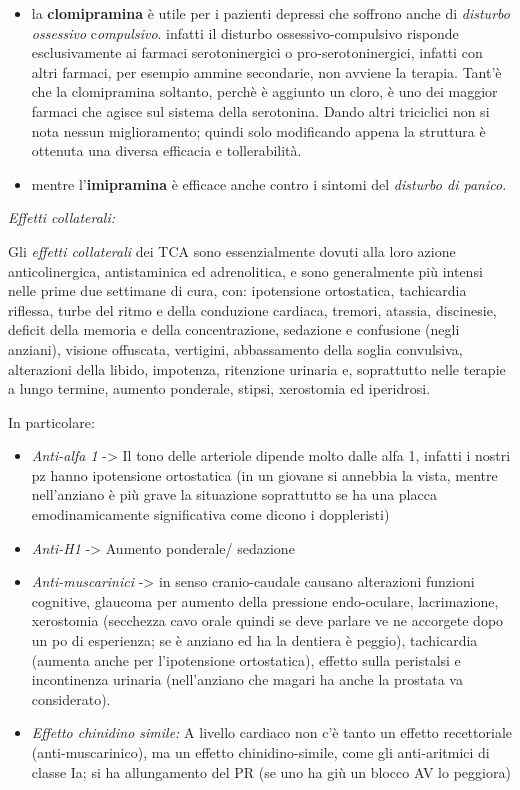 \begin{itemize}
\begin{itemize}
\begin{itemize}
\item
  la \textbf{clomipramina} è utile per i pazienti depressi che soffrono
  anche di \emph{disturbo ossessivo} c\emph{ompulsivo}. infatti il
  disturbo ossessivo-compulsivo risponde esclusivamente ai farmaci
  serotoninergici o pro-serotoninergici, infatti con altri farmaci, per
  esempio ammine secondarie, non avviene la terapia. Tant'è che la
  clomipramina soltanto, perchè è aggiunto un cloro, è uno dei maggior
  farmaci che agisce sul sistema della serotonina. Dando altri
  triciclici non si nota nessun miglioramento; quindi solo modificando
  appena la struttura è ottenuta una diversa efficacia e tollerabilità.
\item
  mentre l'\textbf{imipramina} è efficace anche contro i sintomi del
  \emph{disturbo di panico.}
\end{itemize}

\emph{\emph{Effetti collaterali:}}

Gli \emph{effetti collaterali} dei TCA sono essenzialmente dovuti alla
loro azione anticolinergica, antistaminica ed adrenolitica, e sono
generalmente più intensi nelle prime due settimane di cura, con:
ipotensione ortostatica, tachicardia riflessa, turbe del ritmo e della
conduzione cardiaca, tremori, atassia, discinesie, deficit della memoria
e della concentrazione, sedazione e confusione (negli anziani), visione
offuscata, vertigini, abbassamento della soglia convulsiva, alterazioni
della libido, impotenza, ritenzione urinaria e, soprattutto nelle
terapie a lungo termine, aumento ponderale, stipsi, xerostomia ed
iperidrosi.

In particolare:

\begin{itemize}
\item
  \emph{Anti-alfa 1} -> Il tono delle arteriole dipende molto dalle alfa
  1, infatti i nostri pz hanno ipotensione ortostatica (in un giovane si
  annebbia la vista, mentre nell'anziano è più grave la situazione
  soprattutto se ha una placca emodinamicamente significativa come
  dicono i doppleristi)
\item
  \emph{Anti-H1} -> Aumento ponderale/ sedazione
\item
  \emph{Anti-muscarinici} -> in senso cranio-caudale causano alterazioni
  funzioni cognitive, glaucoma per aumento della pressione endo-oculare,
  lacrimazione, xerostomia (secchezza cavo orale quindi se deve parlare
  ve ne accorgete dopo un po di esperienza; se è anziano ed ha la
  dentiera è peggio), tachicardia (aumenta anche per l'ipotensione
  ortostatica), effetto sulla peristalsi e incontinenza urinaria
  (nell'anziano che magari ha anche la prostata va considerato).
\item
  \emph{Effetto chinidino simile:} A livello cardiaco non c'è tanto un
  effetto recettoriale (anti-muscarinico), ma un effetto
  chinidino-simile, come gli anti-aritmici di classe Ia; si ha
  allungamento del PR (se uno ha giù un blocco AV lo peggiora)
\end{itemize}


\end{itemize}
\end{itemize}
